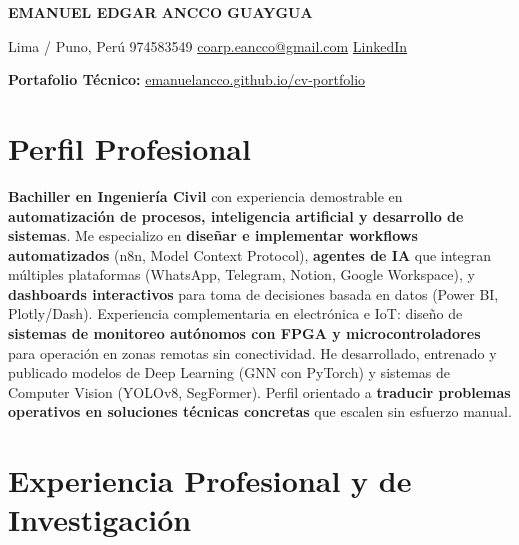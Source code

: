 \documentclass[10pt, a4paper]{article}
\begin{document}
\begin{center}
    {\Huge\bfseries EMANUEL EDGAR ANCCO GUAYGUA}
    \vspace{2mm}

    \faMapMarker*{} Lima / Puno, Perú \quad
    \faPhone*{} 974583549 \quad
    \faEnvelope{} \href{mailto:coarp.eancco@gmail.com}{coarp.eancco@gmail.com} \quad
    \faLinkedin{} \href{https://www.linkedin.com/in/emanuel-edgar-ancco-guaygua-a61210352}{LinkedIn}

    \faGlobe{} \textbf{Portafolio Técnico:} \href{https://emanuelancco.github.io/cv-portfolio/}{emanuelancco.github.io/cv-portfolio}
\end{center}

\section*{Perfil Profesional}
\textbf{Bachiller en Ingeniería Civil} con experiencia demostrable en \textbf{automatización de procesos, inteligencia artificial y desarrollo de sistemas}. Me especializo en \textbf{diseñar e implementar workflows automatizados} (n8n, Model Context Protocol), \textbf{agentes de IA} que integran múltiples plataformas (WhatsApp, Telegram, Notion, Google Workspace), y \textbf{dashboards interactivos} para toma de decisiones basada en datos (Power BI, Plotly/Dash). Experiencia complementaria en electrónica e IoT: diseño de \textbf{sistemas de monitoreo autónomos con FPGA y microcontroladores} para operación en zonas remotas sin conectividad. He desarrollado, entrenado y publicado modelos de Deep Learning (GNN con PyTorch) y sistemas de Computer Vision (YOLOv8, SegFormer). Perfil orientado a \textbf{traducir problemas operativos en soluciones técnicas concretas} que escalen sin esfuerzo manual.

\vspace{1mm}
\begin{center}
\end{center}

\section*{Experiencia Profesional y de Investigación}
\end{document}
